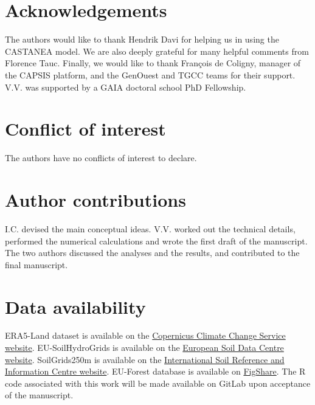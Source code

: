 \documentclass[11pt,]{article}
\begin{document}
\hypertarget{acknowledgements}{%
\section{Acknowledgements}\label{acknowledgements}}

The authors would like to thank Hendrik Davi for helping us in using the
CASTANEA model. We are also deeply grateful for many helpful comments
from Florence Tauc. Finally, we would like to thank François de Coligny,
manager of the CAPSIS platform, and the GenOuest and TGCC teams for
their support. V.V. was supported by a GAIA doctoral school PhD
Fellowship.

\hypertarget{conflict-of-interest}{%
\section{Conflict of interest}\label{conflict-of-interest}}

The authors have no conflicts of interest to declare.

\hypertarget{author-contributions}{%
\section{Author contributions}\label{author-contributions}}

I.C. devised the main conceptual ideas. V.V. worked out the technical
details, performed the numerical calculations and wrote the first draft
of the manuscript. The two authors discussed the analyses and the
results, and contributed to the final manuscript.

\hypertarget{data-availability}{%
\section{Data availability}\label{data-availability}}

ERA5-Land dataset is available on the
\href{https://cds.climate.copernicus.eu/cdsapp\#!/dataset/reanalysis-era5-land?tab=overview}{Copernicus
Climate Change Service website}. EU-SoilHydroGrids is available on the
\href{https://esdac.jrc.ec.europa.eu/content/3d-soil-hydraulic-database-europe-1-km-and-250-m-resolution}{European
Soil Data Centre website}. SoilGrids250m is available on the
\href{https://www.isric.org/explore/soilgrids}{International Soil
Reference and Information Centre website}. EU-Forest database is
available on
\href{https://figshare.com/collections/A_high-resolution_pan-European_tree_occurrence_dataset/3288407}{FigShare}.
The R code associated with this work will be made available on GitLab
upon acceptance of the manuscript.
\end{document}
